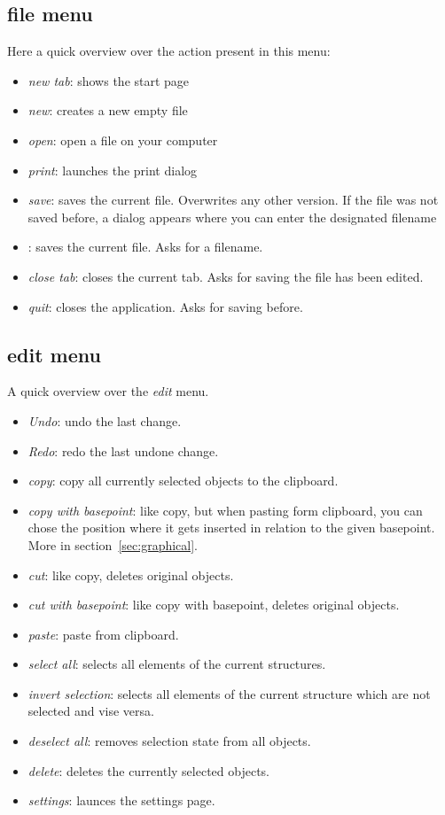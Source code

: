 \documentclass[a4paper,11pt]{report}
\begin{document}
\subsection{file menu}
Here a quick overview over the action present in this menu:
\begin{itemize}
	\item \textit{new tab}: shows the start page
	\item \textit{new}: creates a new empty file
	\item \textit{open}: open a file on your computer
	\item \textit{print}: launches the print dialog
	\item \textit{save}: saves the current file. Overwrites any other version. If the file was not saved before, a dialog appears where you can enter the designated filename
	\item {}: saves the current file. Asks for a filename.
	\item \textit{close tab}: closes the current tab. Asks for saving the file has been edited.
	\item \textit{quit}: closes the application. Asks for saving before.
\end{itemize}

\subsection{edit menu}
A quick overview over the \textit{edit} menu. 
\begin{itemize}
	\item \textit{Undo}: undo the last change.
	\item \textit{Redo}: redo the last undone change.
	\item \textit{copy}: copy all currently selected objects to the clipboard. 
	\item \textit{copy with basepoint}: like copy, but when pasting form clipboard, you can chose the position where it gets inserted in relation to the given basepoint. More in section~\ref{sec:graphical}.
	\item \textit{cut}: like copy, deletes original objects.
	\item \textit{cut with basepoint}: like copy with basepoint, deletes original objects.
	\item \textit{paste}: paste from clipboard.
	\item \textit{select all}: selects all elements of the current structures.
	\item \textit{invert selection}: selects all elements of the current structure which are not selected and vise versa.
	\item \textit{deselect all}: removes selection state from all objects.
	\item \textit{delete}: deletes the currently selected objects.
	\item \textit{settings}: launces the settings page.
\end{itemize}
\end{document}
